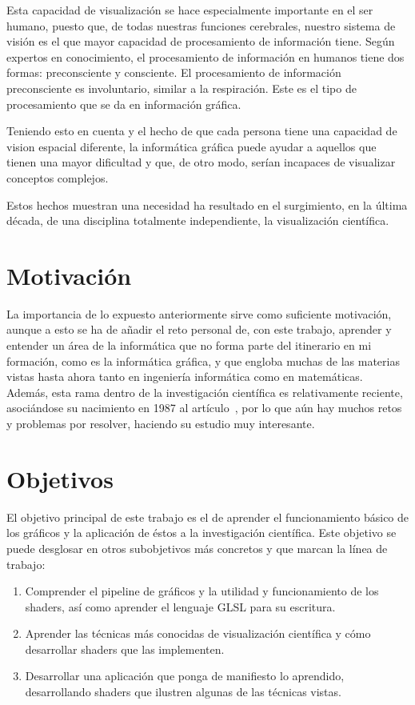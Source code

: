 Esta capacidad de visualización se hace especialmente importante en el ser
humano, puesto que, de todas nuestras funciones cerebrales, nuestro sistema de
visión es el que mayor capacidad de procesamiento de información tiene. Según
expertos en conocimiento, el procesamiento de información en humanos tiene dos
formas: preconsciente y consciente. El procesamiento de información
preconsciente es involuntario, similar a la respiración. Este es el tipo de
procesamiento que se da en información gráfica.
~\citet{Rohrer:2000:SBI:510378.510552}

Teniendo esto en cuenta y el hecho de que cada persona tiene una capacidad de
vision espacial diferente, la informática gráfica puede ayudar a aquellos que
tienen una mayor dificultad y que, de otro modo, serían incapaces de visualizar
conceptos complejos.

Estos hechos muestran una necesidad ha resultado en el surgimiento, en la última
década, de una disciplina totalmente independiente, la visualización científica. 

\section{Motivación}
\label{makereference1.1}

La importancia de lo expuesto anteriormente sirve como suficiente motivación,
aunque a esto se ha de añadir el reto personal de, con este trabajo, aprender
y entender un área de la informática que no forma parte del itinerario en mi
formación, como es la informática gráfica, y que engloba muchas de las materias
vistas hasta ahora tanto en ingeniería informática como en matemáticas.\\

Además, esta rama dentro de la investigación científica es relativamente
reciente, asociándose su nacimiento en 1987 al
artículo~\citet{McCormick:1988:VSC:43965.43966}, por lo que aún hay muchos retos
y problemas por resolver, haciendo su estudio muy interesante.

\section{Objetivos}
\label{makereference1.2}

El objetivo principal de este trabajo es el de aprender el funcionamiento básico
de los gráficos y la aplicación de éstos a la investigación científica.
Este objetivo se puede desglosar en otros subobjetivos más concretos y que
marcan la línea de trabajo:
\begin{enumerate}
		\item Comprender el pipeline de gráficos y la utilidad y funcionamiento
				de los shaders, así como aprender el lenguaje GLSL para su
				escritura.
		\item Aprender las técnicas más conocidas de visualización científica y
				cómo desarrollar shaders que las implementen.
		\item Desarrollar una aplicación que ponga de manifiesto lo aprendido,
				desarrollando shaders que ilustren algunas de las técnicas
				vistas.
\end{enumerate}

